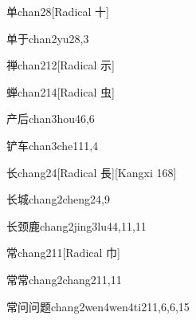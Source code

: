 \begin{entry}{单}{chan2}{8}[Radical 十]
\end{entry}

\begin{entry}{单于}{chan2yu2}{8,3}
\end{entry}

\begin{entry}{禅}{chan2}{12}[Radical 示]
\end{entry}

\begin{entry}{蝉}{chan2}{14}[Radical 虫]
\end{entry}

\begin{entry}{产后}{chan3hou4}{6,6}
\end{entry}

\begin{entry}{铲车}{chan3che1}{11,4}
\end{entry}

\begin{entry}{长}{chang2}{4}[Radical 長][Kangxi 168]
\end{entry}

\begin{entry}{长城}{chang2cheng2}{4,9}
\end{entry}

\begin{entry}{长颈鹿}{chang2jing3lu4}{4,11,11}
\end{entry}

\begin{entry}{常}{chang2}{11}[Radical 巾]
\end{entry}

\begin{entry}{常常}{chang2chang2}{11,11}
\end{entry}

\begin{entry}{常问问题}{chang2wen4wen4ti2}{11,6,6,15}
\end{entry}

